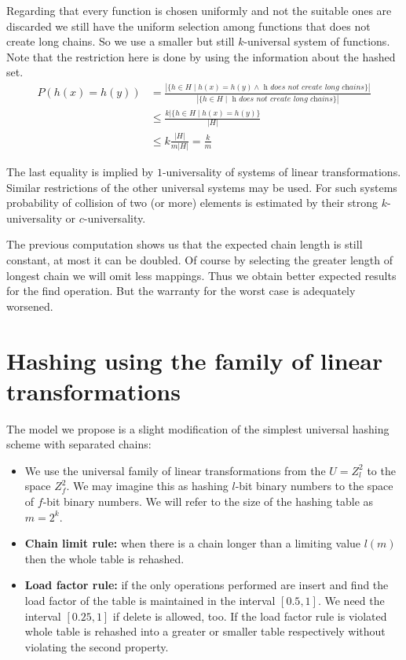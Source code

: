 Regarding that every function is chosen uniformly and not the suitable ones are discarded we still have the uniform selection among functions that does not create long chains. So we use a smaller but still $k$-universal system of functions. Note that the restriction here is done by using the information about the hashed set.
\[
\begin{split}
P(h(x) = h(y)) 
	& =  \frac{|\lbrace h \in H \mid h(x) = h(y) \wedge \textit{ h does not create long chains} \rbrace |}{|\lbrace h \in H \mid \textit{ h does not create long chains} \rbrace|} \\
	& \leq \frac{k |\lbrace h \in H \mid h(x) = h(y) \rbrace}{|H|} \\
	& \leq k \frac{|H|}{m |H|} = \frac{k}{m}
\end{split}
\]

The last equality is implied by $1$-universality of systems of linear transformations. Similar restrictions of the other universal systems may be used. For such systems probability of collision of two (or more) elements is estimated by their strong $k$-universality or $c$-universality.

The previous computation shows us that the expected chain length is still constant, at most it can be doubled. Of course by selecting the greater length of longest chain we will omit less mappings. Thus we obtain better expected results for the find operation. But the warranty for the worst case is adequately worsened.


\section{Hashing using the family of linear transformations}

The model we propose is a slight modification of the simplest universal hashing scheme with separated chains:
\begin{itemize}
\item We use the universal family of linear transformations from the $U = Z^2_l$ to the space $Z^2_f$. We may imagine this as hashing $l$-bit binary numbers to the space of $f$-bit binary numbers. We will refer to the size of the hashing table as $m = 2^k$.
\item \textbf{Chain limit rule:} when there is a chain longer than a limiting value $l(m)$ then the whole table is rehashed.
\item \textbf{Load factor rule:} if the only operations performed are insert and find the load factor of the table is maintained in the interval $\left[0.5, 1\right]$. We need the interval $\left[0.25, 1\right]$ if delete is allowed, too. If the load factor rule is violated whole table is rehashed into a greater or smaller table respectively without violating the second property.
\end{itemize}

